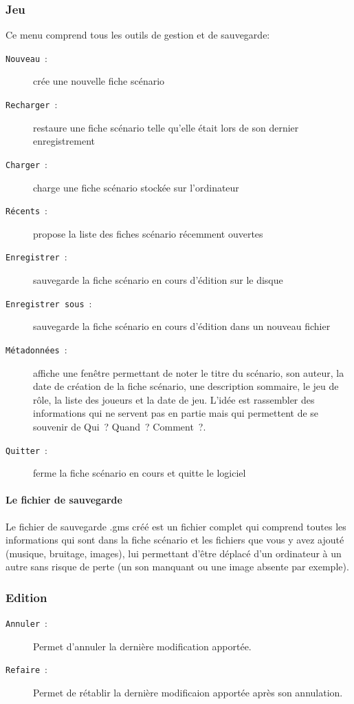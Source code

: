 \documentclass[a4paper,12pt]{article}
\newcommand*{\interfaceitem}[1]{\texttt{#1}}
\newcommand*{\guillemets}[1]{\og #1\fg{}\xspace}
\begin{document}
\subsubsection{Jeu}
Ce menu comprend tous les outils de gestion et de sauvegarde:
\begin{description}
    \item[\interfaceitem{Nouveau}~:]{crée une nouvelle fiche scénario}
    \item[\interfaceitem{Recharger}~:]{restaure une fiche scénario telle qu'elle était lors de son dernier enregistrement}
    \item[\interfaceitem{Charger}~:]{charge une fiche scénario stockée sur l'ordinateur}
    \item[\interfaceitem{Récents}~:]{propose la liste des fiches scénario récemment ouvertes}
    \item[\interfaceitem{Enregistrer}~:]{sauvegarde la fiche scénario en cours d'édition sur le disque}
    \item[\interfaceitem{Enregistrer sous}~:]{sauvegarde la fiche scénario en cours d'édition dans un nouveau fichier}
    \item[\interfaceitem{Métadonnées}~:]{affiche une fenêtre permettant de noter le titre du scénario, son auteur, la date de création de la fiche scénario, une description sommaire, le jeu de rôle, la liste des joueurs et la date de jeu.
            L'idée est rassembler des informations qui ne servent pas en partie mais qui permettent de se souvenir de \guillemets{Qui~? Quand~? Comment~?}.}
    \item[\interfaceitem{Quitter}~:]{ferme la fiche scénario en cours et quitte le logiciel}
\end{description}
\paragraph{Le fichier de sauvegarde}
Le fichier de sauvegarde .gms créé est un fichier complet qui comprend toutes les informations qui sont dans la fiche scénario et les fichiers que vous y avez ajouté (musique, bruitage, images), lui permettant d'être déplacé d'un ordinateur à un autre sans risque de perte (un son manquant ou une image absente par exemple).

\subsubsection{Edition}
\begin{description}
    \item[\interfaceitem{Annuler}~:]{Permet d'annuler la dernière modification apportée.}
    \item[\interfaceitem{Refaire}~:]{Permet de rétablir la dernière modificaion apportée après son annulation.}
\end{description}
\end{document}
